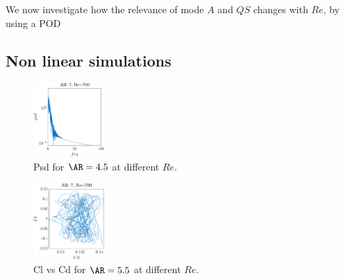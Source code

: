 We now investigate how the relevance of mode $A$ and $QS$ changes with $Re$, by using a POD
   

\subsection{Non linear simulations}

\iffalse
\begin{figure}
  \centering
  \includegraphics[width=0.24\textwidth]{./fig/nnl/psdAR7RE700.png}
  \caption{Psd for $\AR=4.5$ at different $Re$.}
  \label{fig:ClCd}
\end{figure}


\begin{figure}
  \centering
  \includegraphics[width=0.24\textwidth]{./fig/nnl/ClCdAR7RE700.png}
  \caption{Cl vs Cd for $\AR=5.5$ at different $Re$.}
  \label{fig:ClCd}
\end{figure}


